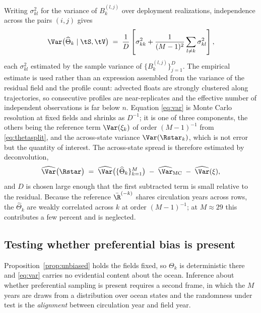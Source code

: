 \begin{remark}
\label{rem:variance}
Writing $\sigma^2_{kl}$ for the variance of $B_k^{(l,j)}$ over deployment
realizations, independence across the pairs $(i,j)$ gives
\begin{equation}
  \label{eq:var}
  \Var\big(\widehat\Theta_k \mid \tS, \tV\big)
  \;=\; \frac{1}{D}\left[\sigma^2_{kk} + \frac{1}{(M-1)^2}\sum_{l\neq k}\sigma^2_{kl}\right],
\end{equation}
each $\sigma^2_{kl}$ estimated by the sample variance of
$\{B_k^{(l,j)}\}_{j=1}^{D}$. The empirical estimate is used rather than an
expression assembled from the variance of the residual field and the profile
count: advected floats are strongly clustered along trajectories, so consecutive
profiles are near-replicates and the effective number of independent
observations is far below $n$. Equation \eqref{eq:var} is Monte Carlo
resolution at fixed fields and shrinks as $D^{-1}$; it is one of three
components, the others being the reference term $\Var(\xi_k)$ of order
$(M-1)^{-1}$ from \eqref{eq:thetasplit}, and the across-state variance
$\Var(\Rstar_k)$, which is not error but the quantity of interest. The
across-state spread is therefore estimated by deconvolution,
\begin{equation}
  \label{eq:deconv}
  \widehat\Var\big(\Rstar\big)
  \;=\; \widehat\Var\big(\{\widehat\Theta_k\}_{k=1}^M\big)
  \;-\; \widehat\Var_{\mathrm{MC}}
  \;-\; \widehat\Var(\xi) ,
\end{equation}
and $D$ is chosen large enough that the first subtracted term is small relative
to the residual. Because the reference $\bar\R^{(-k)}$ shares circulation years
across rows, the $\widehat\Theta_k$ are weakly correlated across $k$ at order
$(M-1)^{-1}$; at $M \approx 29$ this contributes a few percent and is neglected.
\end{remark}

\subsection{Testing whether preferential bias is present}
\label{sec:test}

Proposition~\ref{prop:unbiased} holds the fields fixed, so $\Theta_k$ is
deterministic there and \eqref{eq:var} carries no evidential content about the
ocean. Inference about whether preferential sampling is present requires a
second frame, in which the $M$ years are draws from a distribution over ocean
states and the randomness under test is the \emph{alignment} between circulation
year and field year.

